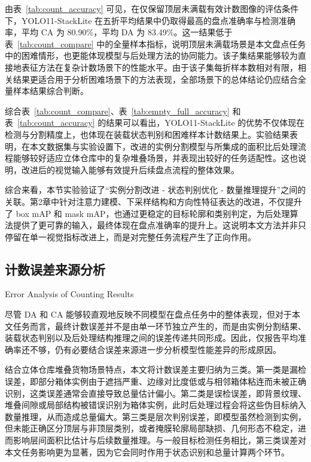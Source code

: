 由表~\ref{tab:count_accuracy} 可见，在仅保留顶层未满载有效计数图像的评估条件下，YOLO11-StackLite 在五折平均结果中仍取得最高的盘点准确率与检测准确率，平均 CA 为 80.90\%，平均 DA 为 83.49\%。这一结果低于表~\ref{tab:count_compare} 中的全量样本指标，说明顶层未满载场景是本文盘点任务中的困难情形，也更能体现模型与后处理方法的协同能力。该子集结果能够较为直接地表征方法在复杂计数场景下的性能水平。由于该子集每折样本数相对有限，相关结果更适合用于分析困难场景下的方法表现，全部场景下的总体结论仍应结合全量样本结果综合判断。

综合表~\ref{tab:count_compare}、表~\ref{tab:empty_full_accuracy} 和表~\ref{tab:count_accuracy} 的结果可以看出，YOLO11-StackLite 的优势不仅体现在检测与分割精度上，也体现在装载状态判别和困难样本计数结果上。实验结果表明，在本文数据集与实验设置下，改进的实例分割模型与所集成的面积比后处理流程能够较好适应立体仓库中的复杂堆叠场景，并表现出较好的任务适配性。这也说明，改进后的视觉输入能够有效提升后续盘点流程的整体效果。

综合来看，本节实验验证了“实例分割改进 - 状态判别优化 - 数量推理提升”之间的关联。第2章中针对注意力建模、下采样结构和方向性特征表达的改进，不仅提升了 box mAP 和 mask mAP，也通过更稳定的目标轮廓和类别判定，为后处理算法提供了更可靠的输入，最终体现在盘点准确率的提升上。这说明本文方法并非只停留在单一视觉指标改进上，而是对完整任务流程产生了正向作用。


\subsection{计数误差来源分析}{Error Analysis of Counting Results}

尽管 DA 和 CA 能够较直观地反映不同模型在盘点任务中的整体表现，但对于本文任务而言，最终计数误差并不是由单一环节独立产生的，而是由实例分割结果、装载状态判别以及后处理结构推理之间的误差传递共同形成。因此，仅报告平均准确率还不够，仍有必要结合误差来源进一步分析模型性能差异的形成原因。

结合立体仓库堆叠货物场景特点，本文将计数误差主要归纳为三类。第一类是漏检误差，即部分箱体实例由于遮挡严重、边缘对比度低或与相邻箱体粘连而未被正确识别，这类误差通常会直接导致总量估计偏小。第二类是误检误差，即背景纹理、堆叠间隙或局部结构被错误识别为箱体实例，此时后处理过程会将这些伪目标纳入数量推理，从而造成总量偏大。第三类是层次判别误差，即模型虽然检测到实例，但未能正确区分顶层与非顶层类别，或者掩膜轮廓局部缺损、几何形态不稳定，进而影响层间面积比估计与后续数量推理。与一般目标检测任务相比，第三类误差对本文任务影响更为显著，因为它会同时作用于状态识别和总量计算两个环节。

